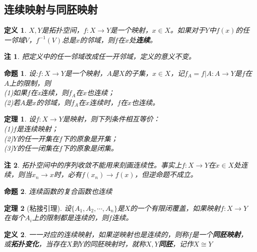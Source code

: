 \documentclass[UTF8]{ctexart}
\newtheorem{dfnt}{定义}
\newtheorem{thr}{定理}
\newtheorem*{note}{注}
\newtheorem{pro}{命题}
\begin{document}
\subsection{连续映射与同胚映射}
\begin{dfnt}
$X,Y$是拓扑空间，$f:X \rightarrow Y$是一个映射，$x \in X$。如果对于$Y$中$f(x)$的任一邻域$V$，$f^{-1}(V)$总是$x$的邻域，则$f$在$x$处\textbf{连续}。
\end{dfnt}
\begin{note}
把定义中的任一邻域改成任一开邻域，定义的意义不变。
\end{note}
\begin{pro}
设:$f:X\rightarrow Y$是一个映射，$A$是$X$的子集，$x \in X$，记$f_A =f|A:A \rightarrow Y$是$f$在$A$上的限制，则\\(1)如果$f$在x连续，则$f_A$在$x$也连续；\\(2)若$A$是$x$的邻域，则$f_A$在$x$连续时，$f$在$x$也连续。
\end{pro}
\begin{thr}
设$f:X\rightarrow Y$是映射，则下列条件相互等价：\\(1)$f$是连续映射；\\(2)$Y$的任一开集在$f$下的原象是开集；\\(3)$Y$的任一闭集在$f$下的原象是闭集。
\end{thr}
\begin{note}
拓扑空间中的序列收敛不能用来刻画连续性。事实上$f:X\rightarrow Y$在$x \in X$处连续，则当$x_n \rightarrow x$时，必有$f(x_n) \rightarrow f(x)$，但逆命题不成立。
\end{note}
\begin{pro}
连续函数的复合函数也连续
\end{pro}
\begin{thr}[粘接引理]
设$\{A_1,A_2,\cdots,A_n\}$是$X$的一个有限闭覆盖，如果映射$f:X\rightarrow Y$在每个$A_i$上的限制都是连续的，则$f$连续。
\end{thr}
\begin{dfnt}
一一对应的连续映射，如果逆映射也是连续的，则称$f$是一个\textbf{同胚映射}，或\textbf{拓扑变化}，当存在$X$到$Y$的同胚映射时，就称$X,Y$\textbf{同胚}，记作$X \cong Y$
\end{dfnt}
\end{document}
